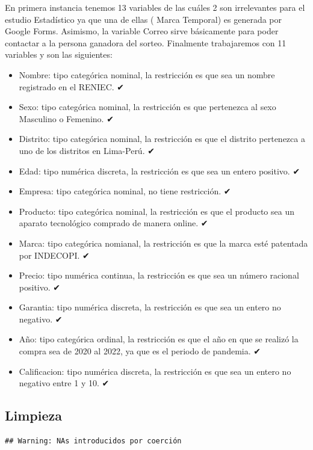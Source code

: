 \documentclass[
]{article}
\begin{document}
En primera instancia tenemos 13 variables de las cuáles 2 son
irrelevantes para el estudio Estadístico ya que una de ellas ( Marca
Temporal) es generada por Google Forms. Asimismo, la variable Correo
sirve básicamente para poder contactar a la persona ganadora del sorteo.
Finalmente trabajaremos con 11 variables y son las siguientes:

\begin{itemize}
\item
  Nombre: tipo categórica nominal, la restricción es que sea un nombre
  registrado en el RENIEC. ✔
\item
  Sexo: tipo categórica nominal, la restricción es que pertenezca al
  sexo Masculino o Femenino. ✔
\item
  Distrito: tipo categórica nominal, la restricción es que el distrito
  pertenezca a uno de los distritos en Lima-Perú. ✔
\item
  Edad: tipo numérica discreta, la restricción es que sea un entero
  positivo. ✔
\item
  Empresa: tipo categórica nominal, no tiene restricción. ✔
\item
  Producto: tipo categórica nominal, la restricción es que el producto
  sea un aparato tecnológico comprado de manera online. ✔
\item
  Marca: tipo categórica nomianal, la restricción es que la marca esté
  patentada por INDECOPI. ✔
\item
  Precio: tipo numérica continua, la restricción es que sea un número
  racional positivo. ✔
\item
  Garantia: tipo numérica discreta, la restricción es que sea un entero
  no negativo. ✔
\item
  Año: tipo categórica ordinal, la restricción es que el año en que se
  realizó la compra sea de 2020 al 2022, ya que es el periodo de
  pandemia. ✔
\item
  Calificacion: tipo numérica discreta, la restricción es que sea un
  entero no negativo entre 1 y 10. ✔
\end{itemize}

\hypertarget{limpieza}{%
\subsection{\texorpdfstring{\textbf{Limpieza}}{Limpieza}}\label{limpieza}}

\begin{verbatim}
## Warning: NAs introducidos por coerción
\end{verbatim}
\end{document}
